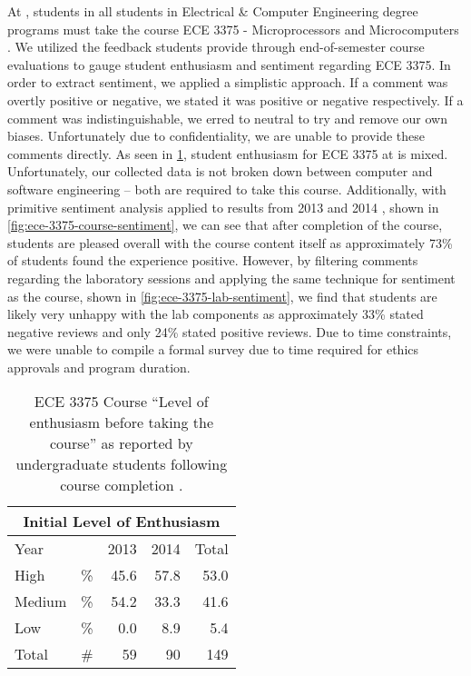 At \uwo{}, students in all students in Electrical \& Computer Engineering degree programs must take the course ECE 3375 - Microprocessors and Microcomputers \cite{uwo-we-programprogression, eceoutline-ece3375}. We utilized the feedback students provide through end-of-semester course evaluations to gauge student enthusiasm and sentiment regarding ECE 3375.  In order to extract sentiment, we applied a simplistic approach. If a comment was overtly positive or negative, we stated it was positive or negative respectively. If a comment was indistinguishable, we erred to neutral to try and remove our own biases. Unfortunately due to confidentiality, we are unable to provide these comments directly. As seen in \cref{table-course-enthusiasm-ece3375}, student enthusiasm for ECE 3375 at \uwo{} is mixed. Unfortunately, our collected data is not broken down between computer and software engineering -- both are required to take this course. Additionally, with primitive sentiment analysis applied to results from 2013 and 2014 \cite{evals:ece3375-2013, evals:ece3375-2014}, shown in \cref{fig:ece-3375-course-sentiment}, we can see that after completion of the course, students are pleased overall with the course content itself as approximately 73\% of students found the experience positive. However, by filtering comments regarding the laboratory sessions and applying the same technique for sentiment as the course, shown in \cref{fig:ece-3375-lab-sentiment}, we find that students are likely very unhappy with the lab components as approximately 33\% stated negative reviews and only 24\% stated positive reviews. Due to time constraints, we were unable to compile a formal survey due to time required for ethics approvals and program duration.

\begin{table}[b!]
    \centering
    \begin{tabular}{lc|r|r|r}
        \multicolumn{5}{c}{Initial Level of Enthusiasm} \\ \hline\hline
        \multicolumn{2}{l}{Year} & \multicolumn{1}{|c}{2013} & \multicolumn{1}{|c}{2014} & \multicolumn{1}{|c}{Total} \\ \hline
        High          & \%       & 45.6                     & 57.8                     & 53.0                      \\ 
        Medium        & \%       & 54.2                     & 33.3                     & 41.6                      \\
        Low           & \%       & 0.0                      & 8.9                      & 5.4                       \\ 
        Total         & \#       & 59                       & 90                       & 149                       \\ \hline
    \end{tabular}
    \caption{ECE 3375 Course ``Level of enthusiasm before taking the course'' as reported by undergraduate students following course completion \cite{evals:ece3375-2013, evals:ece3375-2014}.} 
    \label{table-course-enthusiasm-ece3375}
\end{table}


